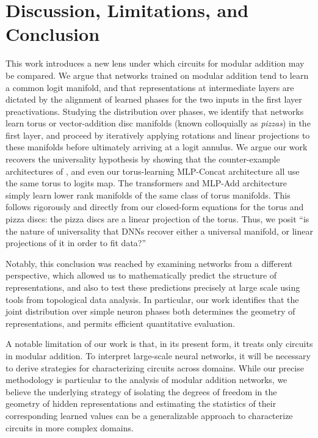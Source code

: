 \documentclass{article} %
\theoremstyle{plain}
\theoremstyle{definition}
\newtheorem{empirical fact}[theorem]{Empirical Fact}
\begin{document}
\section{Discussion, Limitations, and Conclusion}
\label{sec:discussion-conclusion}
This work introduces a new lens under which circuits for modular addition may be compared.
We argue that networks trained on modular addition tend to learn a common logit manifold, and that representations at intermediate layers are dictated by the alignment of learned phases for the two inputs in the first layer preactivations.
Studying the distribution over phases, we identify that networks learn torus or vector-addition disc manifolds (known colloquially as \emph{pizzas}) in the first layer, and proceed by iteratively applying rotations and linear projections to these manifolds before ultimately arriving at a logit annulus. We argue our work recovers the universality hypothesis by showing that the counter-example architectures of \cite{zhong2023the}, and even our torus-learning MLP-Concat architecture all use the same torus to logits map. The transformers and MLP-Add architecture simply learn lower rank manifolds of the same class of torus manifolds. This follows rigorously and directly from our closed-form equations for the torus and pizza discs: the pizza discs are a linear projection of the torus. Thus, we posit ``is the nature of universality that DNNs recover either a universal manifold, or linear projections of it in order to fit data?'' 

Notably, this conclusion was reached by examining networks from a different perspective, which allowed us to mathematically predict the structure of representations, and also to test these predictions precisely at large scale using tools from topological data analysis. In particular, our work identifies that the joint distribution over simple neuron phases both determines the geometry of representations, and permits efficient quantitative evaluation.

A notable limitation of our work is that, in its present form, it treats only circuits in modular addition.
To interpret large-scale neural networks, it will be necessary to derive strategies for characterizing circuits across domains.
While our precise methodology is particular to the analysis of modular addition networks, we believe the underlying strategy of isolating the degrees of freedom in the geometry of hidden representations and estimating the statistics of their corresponding learned values can be a generalizable approach to characterize circuits in more complex domains.
\end{document}
